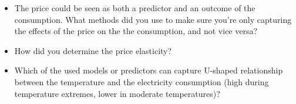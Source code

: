 \documentclass[12pt]{article}
\begin{document}
\begin{itemize}
   \item The price could be seen as both a predictor and an outcome of the consumption. What methods did you use to make sure you’re only capturing the effects of the price on the the consumption, and not vice versa?
   \item How did you determine the price elasticity?
   \item Which of the used models or predictors can capture U-shaped relationship between the temperature and the electricity consumption (high during temperature extremes, lower in moderate temperatures)?
\end{itemize}
\end{document}

